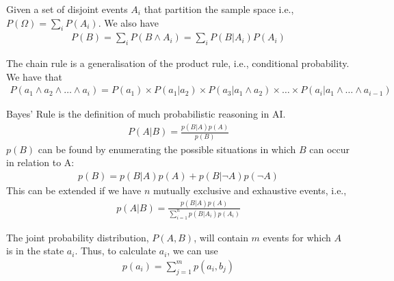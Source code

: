 \documentclass[a4paper]{article}
\theoremstyle{plain}
\theoremstyle{definition}
\newtheorem{defn}{Definition}[section]
\theoremstyle{remark}
\begin{document}
\begin{tcolorbox}[colback=black!3!white,colframe=black!60!white,title=\begin{defn}Total Probability \label{Total Probability}\end{defn}]
Given a set of disjoint events $A_i$ that partition the sample space i.e., $P(\Omega) = \sum_i P(A_i)$. We also have
\begin{align}
P(B) = \sum_{i}^{} P(B \land A_i) = \sum_{i}^{} P(B|A_i)P(A_i)
\end{align}
\end{tcolorbox}
\begin{tcolorbox}[colback=black!3!white,colframe=black!60!white,title=\begin{defn}Chain Rule \label{Chain Rule}\end{defn}]
The chain rule is a generalisation of the product rule, i.e., conditional probability. We have that
\begin{align}
P(a_1 \land a_2 \land \ldots \land a_i) = P(a_1) \times  P(a_1|a_2) \times P(a_3 |a_1 \land a_2) \times \ldots \times P(a_i|a_1\land \ldots \land a_{i-1})
\end{align}
\end{tcolorbox}
\begin{tcolorbox}[colback=black!3!white,colframe=black!60!white,title=\begin{defn}Bayes' Rule \label{Bayes' Rule}\end{defn}]
Bayes' Rule is the definition of much probabilistic reasoning in AI.
\begin{align}
P(A|B) = \frac{p(B|A)p(A)}{p(B)}
\end{align}
$p(B)$ can be found by enumerating the possible situations in which $B$ can occur in relation to A:
\begin{align*}
	p(B) = p(B|A)p(A) + p(B|\neg A)p(\neg A)
\end{align*}
This can be extended if we have $n$ mutually exclusive and exhaustive events, i.e.,
\begin{align*}
	p(A|B) = \frac{p(B|A)p(A)}{\sum_{i=1}^{n} p(B|A_i)p(A_i)}
\end{align*}
\end{tcolorbox}
The joint probability distribution, $P(A,B)$, will contain $m$ events for which $A$ is in the state $a_i$. Thus, to calculate $a_i$, we can use
\begin{align*}
	p(a_i)=\sum_{j=1}^{m} p(a_i,b_j)
\end{align*}
\end{document}
